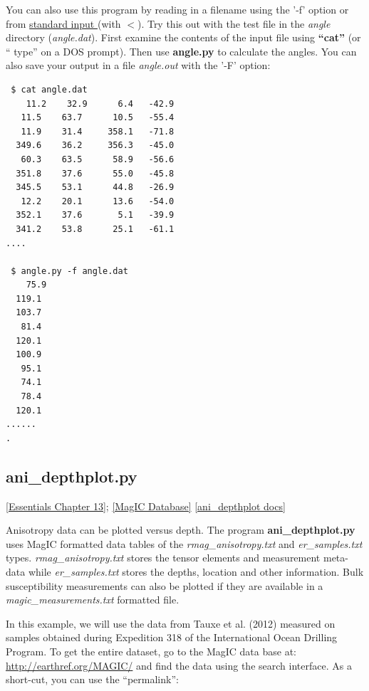 \documentclass[11pt]{book}
\begin{document}
{{ You can also use this program by reading in a filename using the '-f' option or from \href{#standard_IO}{standard input }(with $<$).  Try this out with the test file in the {\it angle} directory ({\it angle.dat}).  First examine the contents of the input file using {\bf ``cat''} (or `` type'' on a DOS prompt).  Then use {\bf angle.py} to calculate the angles.  You can also save your output in a file {\it angle.out} with the '-F' option:

 \begin{verbatim}
 $ cat angle.dat
    11.2    32.9      6.4   -42.9
   11.5    63.7      10.5   -55.4
   11.9    31.4     358.1   -71.8
  349.6    36.2     356.3   -45.0
   60.3    63.5      58.9   -56.6
  351.8    37.6      55.0   -45.8
  345.5    53.1      44.8   -26.9
   12.2    20.1      13.6   -54.0
  352.1    37.6       5.1   -39.9
  341.2    53.8      25.1   -61.1
....

 $ angle.py -f angle.dat
    75.9
  119.1
  103.7
   81.4
  120.1
  100.9
   95.1
   74.1
   78.4
  120.1
......
.
\end{verbatim}


\subsection{ani\_depthplot.py}
\href{http://earthref.org/MAGIC/books/Tauxe/Essentials/WebBook3ch13.html#ch13}{[Essentials Chapter 13]};
\href{#MagICDatabase}{[MagIC Database]}
\href{https://github.com/PmagPy/PmagPy/blob/master/programs/ani_depthplot.py}{[ani\_depthplot docs]}

Anisotropy data can be plotted versus depth.  The program {\bf ani\_depthplot.py} uses MagIC formatted data tables of the {\it rmag\_anisotropy.txt} and {\it er\_samples.txt} types.  {\it rmag\_anisotropy.txt} stores the tensor elements and measurement meta-data while {\it er\_samples.txt} stores the depths, location and other information.  Bulk susceptibility measurements can also be plotted if they are available in a {\it magic\_measurements.txt} formatted file.

In this example, we will use the data from Tauxe et al. (2012) \nocite{tauxe12} measured on samples obtained during Expedition 318 of the International Ocean Drilling Program.  To get the entire dataset, go to the MagIC data base at:  \url{http://earthref.org/MAGIC/}
and find the data using the search interface.   As a short-cut, you can use the ``permalink'':

}}
\end{document}
